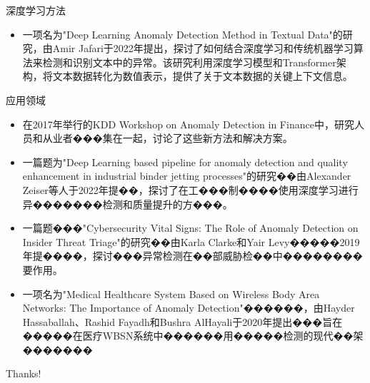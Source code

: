 \documentclass[UTF8,AutoFakeBold,AutoFakeSlant]{beamer}
\begin{document}
\begin{frame}{深度学习方法}
    \begin{itemize}
        \item 一项名为"Deep Learning Anomaly Detection Method in Textual Data"的研究，由Amir Jafari于2022年提出，探讨了如何结合深度学习和传统机器学习算法来检测和识别文本中的异常。该研究利用深度学习模型和Transformer架构，将文本数据转化为数值表示，提供了关于文本数据的关键上下文信息。
    \end{itemize}
\end{frame}

\begin{frame}{应用领域}
    \scriptsize
    \begin{itemize}
        \item 在2017年举行的KDD Workshop on Anomaly Detection in Finance中，研究人员和从业者���集在一起，讨论了这些新方法和解决方案。
        \item 一篇题为"Deep Learning based pipeline for anomaly detection and quality enhancement in industrial binder jetting processes"的研究��由Alexander Zeiser等人于2022年提��，探讨了在工���制����使用深度学习进行异�������检测和质量提升的方���。
        \item 一篇题���"Cybersecurity Vital Signs: The Role of Anomaly Detection on Insider Threat Triage"的研究��由Karla Clarke和Yair Levy�����2019年提����，探讨���异常检测在��部威胁检��中��������要作用。
        \item 一项名为"Medical Healthcare System Based on Wireless Body Area Networks: The Importance of Anomaly Detection"������，由Hayder Hassaballah、Rashid Fayadh和Bushra AlHayali于2020年提出���旨在�����在医疗WBSN系统中������用�����检测的现代��架�������
    \end{itemize}
\end{frame}

\begin{frame}
    \begin{center}
        {\Huge\calligra Thanks!}
    \end{center}
\end{frame}
\end{document}
